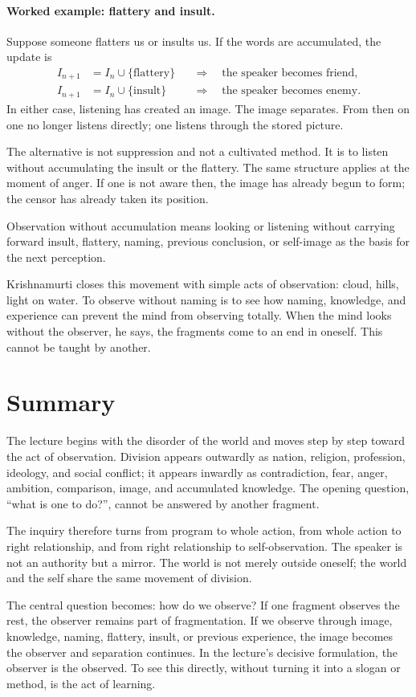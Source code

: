 \paragraph{Worked example: flattery and insult.}
Suppose someone flatters us or insults us. If the words are accumulated, the update is
\begin{align}
I_{n+1}
&= I_n \cup \{\text{flattery}\}
&&\Longrightarrow\quad \text{the speaker becomes friend},\\
I_{n+1}
&= I_n \cup \{\text{insult}\}
&&\Longrightarrow\quad \text{the speaker becomes enemy}.
\end{align}
In either case, listening has created an image. The image separates. From then on one no longer listens directly; one listens through the stored picture.

The alternative is not suppression and not a cultivated method. It is to listen without accumulating the insult or the flattery. The same structure applies at the moment of anger. If one is not aware then, the image has already begun to form; the censor has already taken its position.

\begin{definition}
Observation without accumulation means looking or listening without carrying forward insult, flattery, naming, previous conclusion, or self-image as the basis for the next perception.
\end{definition}

Krishnamurti closes this movement with simple acts of observation: cloud, hills, light on water. To observe without naming is to see how naming, knowledge, and experience can prevent the mind from observing totally. When the mind looks without the observer, he says, the fragments come to an end in oneself. This cannot be taught by another.

\section{Summary}

The lecture begins with the disorder of the world and moves step by step toward the act of observation. Division appears outwardly as nation, religion, profession, ideology, and social conflict; it appears inwardly as contradiction, fear, anger, ambition, comparison, image, and accumulated knowledge. The opening question, ``what is one to do?'', cannot be answered by another fragment.

The inquiry therefore turns from program to whole action, from whole action to right relationship, and from right relationship to self-observation. The speaker is not an authority but a mirror. The world is not merely outside oneself; the world and the self share the same movement of division.

The central question becomes: how do we observe? If one fragment observes the rest, the observer remains part of fragmentation. If we observe through image, knowledge, naming, flattery, insult, or previous experience, the image becomes the observer and separation continues. In the lecture's decisive formulation, the observer is the observed. To see this directly, without turning it into a slogan or method, is the act of learning.